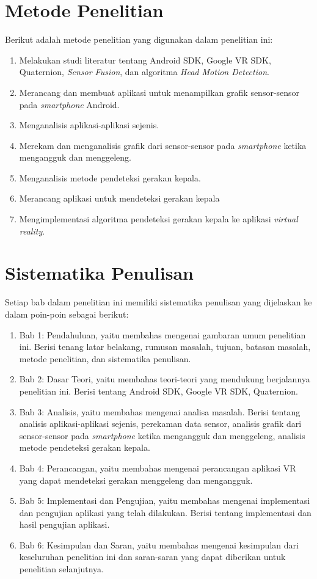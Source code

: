 \section{Metode Penelitian}

Berikut adalah metode penelitian yang digunakan dalam penelitian ini:
	\begin{enumerate}
		\item Melakukan studi literatur tentang Android SDK, Google VR SDK, Quaternion, \textit{Sensor Fusion}, dan algoritma \textit{Head Motion Detection}.
		\item Merancang dan membuat aplikasi untuk menampilkan grafik sensor-sensor pada \textit{smartphone} Android.
		\item Menganalisis aplikasi-aplikasi sejenis.
		\item Merekam dan menganalisis grafik dari sensor-sensor pada \textit{smartphone} ketika mengangguk dan menggeleng.
		\item Menganalisis metode pendeteksi gerakan kepala.
		\item Merancang aplikasi untuk mendeteksi gerakan kepala
		\item Mengimplementasi algoritma pendeteksi gerakan kepala ke aplikasi \textit{virtual reality}.
	\end{enumerate}
\section{Sistematika Penulisan}

Setiap bab dalam penelitian ini memiliki sistematika penulisan yang dijelaskan ke dalam poin-poin sebagai berikut:
\begin{enumerate}
	\item Bab 1: Pendahuluan, yaitu membahas mengenai gambaran umum penelitian ini. Berisi tenang latar belakang, rumusan masalah, tujuan, batasan masalah, metode penelitian, dan sistematika penulisan.
	\item Bab 2: Dasar Teori, yaitu membahas teori-teori yang mendukung berjalannya penelitian ini. Berisi tentang Android SDK, Google VR SDK, Quaternion.
	\item Bab 3: Analisis, yaitu membahas mengenai analisa masalah. Berisi tentang analisis aplikasi-aplikasi sejenis, perekaman data sensor, analisis grafik dari sensor-sensor pada \textit{smartphone} ketika mengangguk dan menggeleng, analisis metode pendeteksi gerakan kepala. 
	\item Bab 4: Perancangan, yaitu membahas mengenai perancangan aplikasi VR yang dapat mendeteksi gerakan menggeleng dan mengangguk.
	\item Bab 5: Implementasi dan Pengujian, yaitu membahas mengenai implementasi dan pengujian aplikasi yang telah dilakukan. Berisi tentang implementasi dan hasil pengujian aplikasi.
	\item Bab 6: Kesimpulan dan Saran, yaitu membahas mengenai kesimpulan dari keseluruhan penelitian ini dan saran-saran yang dapat diberikan untuk penelitian selanjutnya. 
\end{enumerate}